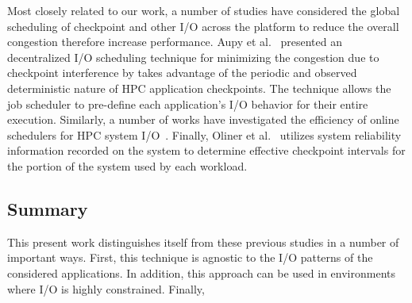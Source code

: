 Most closely related to our work, a number of studies have considered the
global scheduling of checkpoint and other I/O across the platform to reduce the
overall congestion therefore increase performance.  Aupy et
al.~\cite{Aupy:2017:Periodic} presented an decentralized I/O scheduling
technique for minimizing the congestion due to checkpoint interference by takes
advantage of the periodic and observed deterministic nature of HPC application
checkpoints.  The technique allows the job scheduler to pre-define each
application’s I/O behavior for their entire execution.  Similarly, a number of
works have investigated the efficiency of online schedulers for HPC system
I/O~\cite{Dorier2014,Gainaru:2015:Scheduling,Zhou:2015:IOAware}.  Finally,
Oliner et al.~\cite{Oliner:2006:Cooperative} utilizes system reliability
information recorded on the system to determine effective checkpoint intervals
for the portion of the system used by each workload.

\subsection{Summary}

This present work distinguishes itself from these previous studies in a number
of important ways.  First, this technique is agnostic to the I/O patterns of
the considered applications.  In addition, this approach can be used in
environments where I/O is highly constrained.  Finally, 
